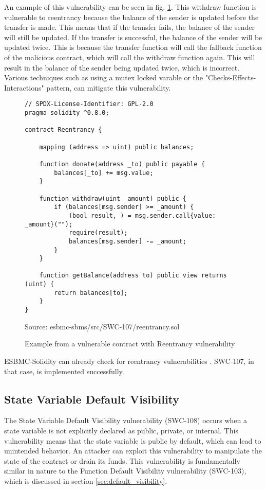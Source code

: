 An example of this vulnerability can be seen in fig. \ref{fig:reentrancy}. This withdraw function is vulnerable to reentrancy because the balance of the sender is updated before the transfer is made. This means that if the transfer fails, the balance of the sender will still be updated. If the transfer is successful, the balance of the sender will be updated twice. This is because the transfer function will call the fallback function of the malicious contract, which will call the withdraw function again. This will result in the balance of the sender being updated twice, which is incorrect. Various techniques such as using a mutex locked varable or the "Checks-Effects-Interactions" pattern, can mitigate this vulnerability.

\begin{figure}
\begin{lstlisting}
// SPDX-License-Identifier: GPL-2.0
pragma solidity ^0.8.0;

contract Reentrancy {

    mapping (address => uint) public balances;

    function donate(address _to) public payable {
        balances[_to] += msg.value;
    }

    function withdraw(uint _amount) public {
        if (balances[msg.sender] >= _amount) {
            (bool result, ) = msg.sender.call{value: _amount}("");
            require(result);
            balances[msg.sender] -= _amount;
        }
    }

    function getBalance(address to) public view returns (uint) {
        return balances[to];
    }
}
\end{lstlisting}
\caption{Example from a vulnerable contract with Reentrancy vulnerability }
Source: esbmc-sbms/src/SWC-107/reentrancy.sol
\label{fig:reentrancy}
\end{figure}

ESBMC-Solidity can already check for reentrancy vulnerabilities \cite{salim2022esbmc}. SWC-107, in that case, is implemented successfully.

\subsection{State Variable Default Visibility}
\label{sec:state_variable_default_visibility}

The State Variable Default Visibility vulnerability (SWC-108) occurs when a state variable is not explicitly declared as public, private, or internal. This vulnerability means that the state variable is public by default, which can lead to unintended behavior. An attacker can exploit this vulnerability to manipulate the state of the contract or drain its funds. This vulnerability is fundamentally similar in nature to the Function Default Visibility vulnerability (SWC-103), which is discussed in section \ref{sec:default_visibility}.

